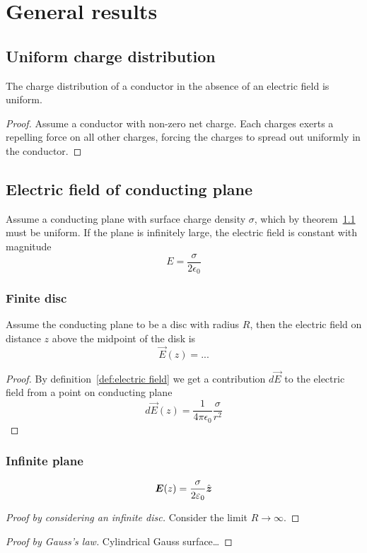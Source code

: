 \section{General results}

\subsection{Uniform charge distribution}
\label{uniform charge distribution}
The charge distribution of a conductor in the absence of an electric
field is uniform.
\begin{proof}
  Assume a conductor with non-zero net charge. Each charges exerts a
  repelling force on all other charges, forcing the charges to spread
  out uniformly in the conductor.
\end{proof}

\subsection{Electric field of conducting plane}
\label{electric field of conducting plane}

Assume a conducting plane with surface charge density $\sigma$, which
by theorem~\ref{uniform charge distribution} must be uniform. If the
plane is infinitely large, the electric field is constant with magnitude
\begin{equation*}
  E = \frac{\sigma}{2\epsilon_0}
\end{equation*}

\subsubsection{Finite disc}

Assume the conducting plane to be a disc with radius $R$, then the
electric field on distance $z$ above the midpoint of the disk is
\begin{equation*}
  \vec{E}(z) = ...
\end{equation*}
\begin{proof}
  By definition~\ref{def:electric field} we get a contribution
  $d\vec{E}$ to the electric field from a point on conducting plane
  \begin{equation*}
    d\vec{E}(z)=\frac{1}{4\pi\epsilon_0}\frac{\sigma}{r^2}
  \end{equation*}
\end{proof}

\subsubsection{Infinite plane}
\begin{equation*}
  \boldsymbol{E}(z) = \frac{\sigma}{2\varepsilon_0}\hat{\boldsymbol{z}}
\end{equation*}
\begin{proof}[Proof by considering an infinite disc]
  Consider the limit $R \to \infty$.
\end{proof}
\begin{proof}[Proof by Gauss's law]
  Cylindrical Gauss surface\ldots
\end{proof}
